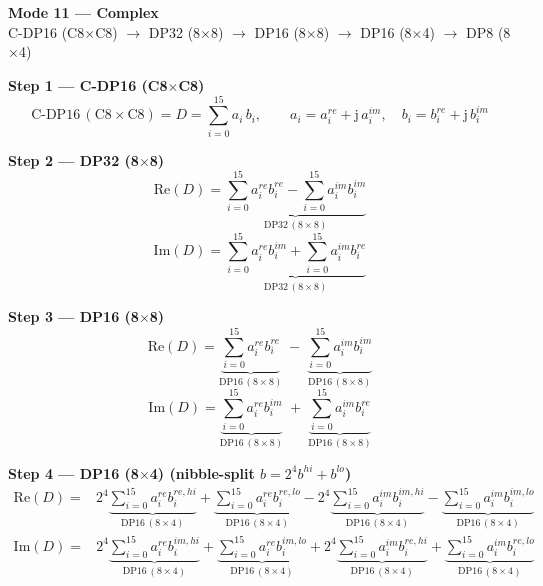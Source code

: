 \documentclass[fleqn]{article}
\newcommand{\DPop}[3]{\mathrm{DP#1}\,(#2\!\times\!#3)}
\begin{document}
\begin{center}
{\LARGE \textbf{Mode 11 --- Complex}}\\[4pt]
{\large C-DP16 (C8$\times$C8) $\rightarrow$ DP32 (8$\times$8) $\rightarrow$ DP16 (8$\times$8) $\rightarrow$ DP16 (8$\times$4) $\rightarrow$ DP8 (8$\times$4)}
\end{center}

\vspace{1.5em}

\noindent\textbf{Step 1 --- C-DP16 (C8$\times$C8)}
\[
\text{C-DP16}\,(\mathrm{C8}\!\times\!\mathrm{C8}) = D = \sum_{i=0}^{15} a_i \, b_i, \qquad
a_i = a_i^{re} + \mathrm{j}\,a_i^{im}, \quad
b_i = b_i^{re} + \mathrm{j}\,b_i^{im}
\]

\vspace{0.3em}

\noindent\textbf{Step 2 --- DP32 (8$\times$8)}
\[
\mathrm{Re}(D) = \underbrace{\sum_{i=0}^{15} a_i^{re} b_i^{re}
  - \sum_{i=0}^{15} a_i^{im} b_i^{im}}_{\DPop{32}{8}{8}}
\]
\[
\mathrm{Im}(D) = \underbrace{\sum_{i=0}^{15} a_i^{re} b_i^{im}
  + \sum_{i=0}^{15} a_i^{im} b_i^{re}}_{\DPop{32}{8}{8}}
\]

\vspace{0.3em}

\noindent\textbf{Step 3 --- DP16 (8$\times$8)}
\[
\mathrm{Re}(D) = \underbrace{\sum_{i=0}^{15} a_i^{re} b_i^{re}}_{\DPop{16}{8}{8}}
  \; - \; \underbrace{\sum_{i=0}^{15} a_i^{im} b_i^{im}}_{\DPop{16}{8}{8}}
\]
\[
\mathrm{Im}(D) = \underbrace{\sum_{i=0}^{15} a_i^{re} b_i^{im}}_{\DPop{16}{8}{8}}
  \; + \; \underbrace{\sum_{i=0}^{15} a_i^{im} b_i^{re}}_{\DPop{16}{8}{8}}
\]

\vspace{0.3em}

\noindent\textbf{Step 4 --- DP16 (8$\times$4) \quad (nibble-split $b = 2^{4} b^{hi} + b^{lo}$)}
\begin{align*}
\mathrm{Re}(D) = {}
  & 2^{4} \underbrace{\sum_{i=0}^{15} a_i^{re} b_i^{re,hi}}_{\DPop{16}{8}{4}}
  + \underbrace{\sum_{i=0}^{15} a_i^{re} b_i^{re,lo}}_{\DPop{16}{8}{4}}
  - 2^{4} \underbrace{\sum_{i=0}^{15} a_i^{im} b_i^{im,hi}}_{\DPop{16}{8}{4}}
  - \underbrace{\sum_{i=0}^{15} a_i^{im} b_i^{im,lo}}_{\DPop{16}{8}{4}}
\end{align*}
\begin{align*}
\mathrm{Im}(D) = {}
  & 2^{4} \underbrace{\sum_{i=0}^{15} a_i^{re} b_i^{im,hi}}_{\DPop{16}{8}{4}}
  + \underbrace{\sum_{i=0}^{15} a_i^{re} b_i^{im,lo}}_{\DPop{16}{8}{4}}
  + 2^{4} \underbrace{\sum_{i=0}^{15} a_i^{im} b_i^{re,hi}}_{\DPop{16}{8}{4}}
  + \underbrace{\sum_{i=0}^{15} a_i^{im} b_i^{re,lo}}_{\DPop{16}{8}{4}}
\end{align*}
\end{document}
